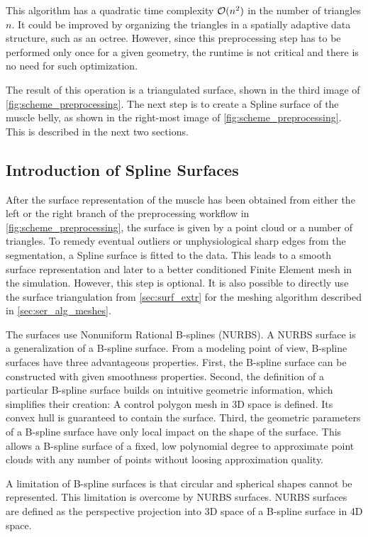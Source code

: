 This algorithm has a quadratic time complexity $\mathcal{O}(n^2)$ in the number of triangles $n$. It could be improved by organizing the triangles in a spatially adaptive data structure, such as an octree. However, since this preprocessing step has to be performed only once for a given geometry, the runtime is not critical and there is no need for such optimization.

The result of this operation is a triangulated surface, shown in the third image of \cref{fig:scheme_preprocessing}. The next step is to create a Spline surface of the muscle belly, as shown in the right-most image of \cref{fig:scheme_preprocessing}. This is described in the next two sections.

\subsection{Introduction of Spline Surfaces}\label{sec:nurbs}
After the surface representation of the muscle has been obtained from either the left or the right branch of the preprocessing workflow in \cref{fig:scheme_preprocessing}, the surface is given by a point cloud or a number of triangles. To remedy eventual outliers or unphysiological sharp edges from the segmentation, a Spline surface is fitted to the data. This leads to a smooth surface representation and later to a better conditioned Finite Element mesh in the simulation. However, this step is optional. It is also possible to directly use the surface triangulation from \cref{sec:surf_extr} for the meshing algorithm described in \cref{sec:ser_alg_meshes}.

The surfaces use Nonuniform Rational B-splines (NURBS). A NURBS surface is a generalization of a B-spline surface. From a modeling point of view, B-spline surfaces have three advantageous properties.
First, the B-spline surface can be constructed with given smoothness properties.  
Second, the definition of a particular B-spline surface builds on intuitive geometric information, which simplifies their creation: A control polygon mesh in 3D space is defined. Its convex hull is guaranteed to contain the surface.
Third, the geometric parameters of a B-spline surface have only local impact on the shape of the surface. This allows a B-spline surface of a fixed, low polynomial degree to approximate point clouds with any number of points without loosing approximation quality.

A limitation of B-spline surfaces is that circular and spherical shapes cannot be represented. This limitation is overcome by NURBS surfaces. NURBS surfaces are defined as the perspective projection into 3D space of a B-spline surface in 4D space.

